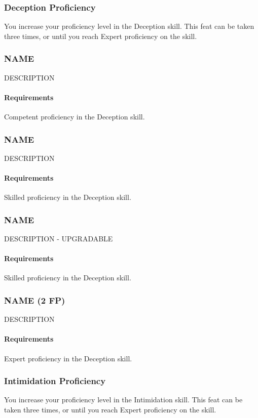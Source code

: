 \subsubsection{Deception Proficiency} \label{feat::deceptionprof}
    You increase your proficiency level in the Deception skill.
    This feat can be taken three times, or until you reach Expert proficiency on the skill.
\subsubsection{NAME} \label{feat::name}
    DESCRIPTION
    \paragraph{Requirements} Competent proficiency in the Deception skill.
\subsubsection{NAME} \label{feat::name}
    DESCRIPTION
    \paragraph{Requirements} Skilled proficiency in the Deception skill.
\subsubsection{NAME} \label{feat::name}
    DESCRIPTION - UPGRADABLE
    \paragraph{Requirements} Skilled proficiency in the Deception skill.
\subsubsection{NAME (2 FP)} \label{feat::name}
    DESCRIPTION
    \paragraph{Requirements} Expert proficiency in the Deception skill.
\subsubsection{Intimidation Proficiency} \label{feat::intimidationprof}
    You increase your proficiency level in the Intimidation skill.
    This feat can be taken three times, or until you reach Expert proficiency on the skill.
